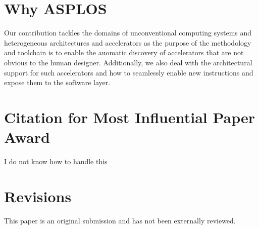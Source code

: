 \documentclass[pageno]{jpaper}
\begin{document}
\section{Why ASPLOS}
\label{sec:why-asplos}

Our contribution tackles the domains of unconventional computing systems and
heterogeneous architectures and accelerators as the purpose of the methodology
and toolchain is to enable the auomatic discovery of accelerators that are not
obvious to the human designer. Additionally, we also deal with the architectural 
support for such accelerators and how to seamlessly enable new instructions and
expose them to the software layer.


\section{Citation for Most Influential Paper Award}
\label{sec:citation}

{\color{red}I do not know how to handle this}

\section{Revisions}
\label{sec:revisions}

This paper is an original submission and has not been externally reviewed.

 
\pagebreak


\end{document}
